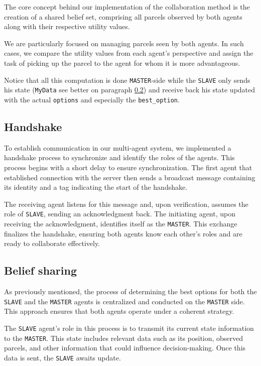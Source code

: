 \documentclass[12pt]{article}
\begin{document}
The core concept behind our implementation of the collaboration method is the creation of a shared belief set, comprising all parcels observed by both agents along with their respective utility values.

We are particularly focused on managing parcels seen by both agents. In such cases, we compare the utility values from each agent's perspective and assign the task of picking up the parcel to the agent for whom it is more advantageous.

Notice that all this computation is done \texttt{MASTER}-side while the \texttt{SLAVE} only sends his state (\texttt{MyData} see better on paragraph \ref{belief}) and receive back his state updated with the actual \texttt{options} and especially the \texttt{best\_option}. 

\subsection{Handshake}

To establish communication in our multi-agent system, we implemented a handshake process to synchronize and identify the roles of the agents. This process begins with a short delay to ensure synchronization. The first agent that established connection with the server then sends a broadcast message containing its identity and a tag indicating the start of the handshake.

The receiving agent listens for this message and, upon verification, assumes the role of \texttt{SLAVE}, sending an acknowledgment back. The initiating agent, upon receiving the acknowledgment, identifies itself as the \texttt{MASTER}. This exchange finalizes the handshake, ensuring both agents know each other's roles and are ready to collaborate effectively. 

\subsection{Belief sharing}
\label{belief}

As previously mentioned, the process of determining the best options for both the \texttt{SLAVE} and the \texttt{MASTER} agents is centralized and conducted on the \texttt{MASTER} side. This approach ensures that both agents operate under a coherent strategy.

The \texttt{SLAVE} agent's role in this process is to transmit its current state information to the \texttt{MASTER}. This state includes relevant data such as its position, observed parcels, and other information that could influence decision-making. Once this data is sent, the \texttt{SLAVE} awaits update.
\end{document}
